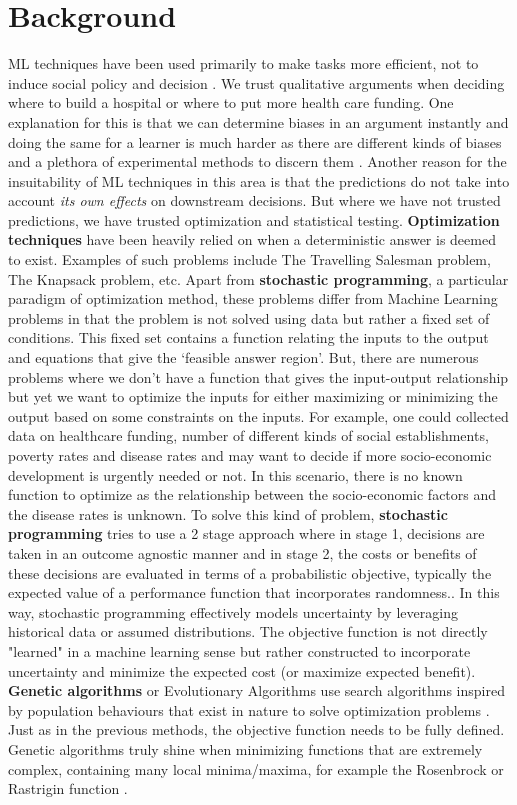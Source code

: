 \documentclass[12pt, letterpaper]{article}
\begin{document}
\section{Background}
\label{sec: Background}
ML techniques have been used primarily to make tasks more efficient, not to
induce social policy and decision \cite{ml_policy}. We trust qualitative
arguments when deciding where to build a hospital or where to put more health
care funding. One explanation for this is that we can determine biases in an
argument instantly and doing the same for a learner is much harder as there are
different kinds of biases and a plethora of experimental methods to discern them
\cite{bias}. Another reason for the insuitability of ML techniques in this area
is that the predictions do not take into account \textit{its own effects} on
downstream decisions. But where we have not trusted predictions, we have trusted
optimization and statistical testing. \textbf{Optimization techniques} have been
heavily relied on when a deterministic answer is deemed to exist. Examples of
such problems include The Travelling Salesman problem, The Knapsack problem,
etc. Apart from \textbf{stochastic programming}, a particular paradigm of
optimization method, these problems differ from Machine Learning problems in
that the problem is not solved using data but rather a fixed set of conditions.
This fixed set contains a function relating the inputs to the output and
equations that give the `feasible answer region'. But, there are numerous
problems where we don't have a function that gives the input-output relationship
but yet we want to optimize the inputs for either maximizing or minimizing the
output based on some constraints on the inputs. For example, one could collected
data on healthcare funding, number of different kinds of social establishments,
poverty rates and disease rates and may want to decide if more socio-economic
development is urgently needed or not. In this scenario, there is no known
function to optimize as the relationship between the socio-economic factors and
the disease rates is unknown. To solve this kind of problem, \textbf{stochastic
programming} tries to use a 2 stage approach where in stage 1, decisions are
taken in an outcome agnostic manner and in stage 2, the costs or benefits of
these decisions are evaluated in terms of a probabilistic objective, typically
the expected value of a performance function that incorporates randomness.. In
this way, stochastic programming effectively models uncertainty by leveraging
historical data or assumed distributions. The objective function is not directly
"learned" in a machine learning sense but rather constructed to incorporate
uncertainty and minimize the expected cost (or maximize expected benefit).
{\textbf{Genetic algorithms}} or Evolutionary Algorithms use search algorithms
inspired by population behaviours that exist in nature to solve optimization
problems \cite{Kruse2022}. Just as in the previous methods, the objective
function needs to be fully defined. Genetic algorithms truly shine when
minimizing functions that are extremely complex, containing many local
minima/maxima, for example the Rosenbrock or Rastrigin function
\cite{test_functions}.
\end{document}
